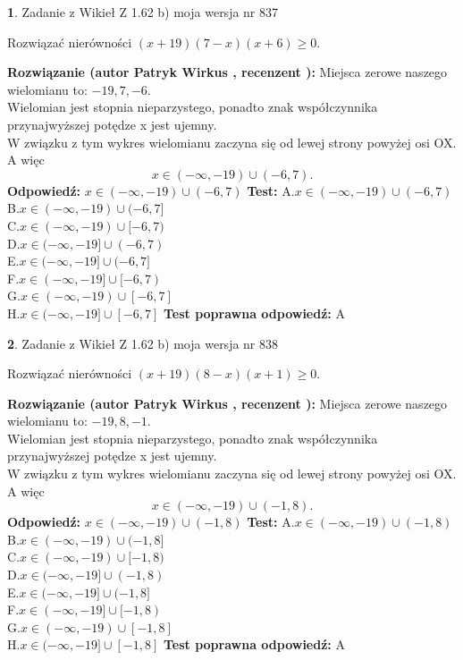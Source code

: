 \documentclass[12pt, a4paper]{article}
\theoremstyle{definition} %
\newtheorem{zad}{}
\newcommand{\zadStart}[1]{\begin{zad}#1\newline}
\newcommand{\zadStop}{\end{zad}}
\newcommand{\rozwStart}[2]{\noindent \textbf{Rozwiązanie (autor #1 , recenzent #2): }\newline}
\newcommand{\rozwStop}{\newline}
\newcommand{\odpStart}{\noindent \textbf{Odpowiedź:}\newline}
\newcommand{\odpStop}{\newline}
\newcommand{\testStart}{\noindent \textbf{Test:}\newline}
\newcommand{\testStop}{\newline}
\newcommand{\kluczStart}{\noindent \textbf{Test poprawna odpowiedź:}\newline}
\newcommand{\kluczStop}{\newline}
\begin{document}
\zadStart{Zadanie z Wikieł Z 1.62 b) moja wersja nr 837}

Rozwiązać nierówności $(x+19)(7-x)(x+6)\ge0$.
\zadStop
\rozwStart{Patryk Wirkus}{}
Miejsca zerowe naszego wielomianu to: $-19, 7, -6$.\\
Wielomian jest stopnia nieparzystego, ponadto znak współczynnika przy\linebreak najwyższej potędze x jest ujemny.\\ W związku z tym wykres wielomianu zaczyna się od lewej strony powyżej osi OX. A więc $$x \in (-\infty,-19) \cup (-6,7).$$
\rozwStop
\odpStart
$x \in (-\infty,-19) \cup (-6,7)$
\odpStop
\testStart
A.$x \in (-\infty,-19) \cup (-6,7)$\\
B.$x \in (-\infty,-19) \cup (-6,7]$\\
C.$x \in (-\infty,-19) \cup [-6,7)$\\
D.$x \in (-\infty,-19] \cup (-6,7)$\\
E.$x \in (-\infty,-19] \cup (-6,7]$\\
F.$x \in (-\infty,-19] \cup [-6,7)$\\
G.$x \in (-\infty,-19) \cup [-6,7]$\\
H.$x \in (-\infty,-19] \cup [-6,7]$
\testStop
\kluczStart
A
\kluczStop



\zadStart{Zadanie z Wikieł Z 1.62 b) moja wersja nr 838}

Rozwiązać nierówności $(x+19)(8-x)(x+1)\ge0$.
\zadStop
\rozwStart{Patryk Wirkus}{}
Miejsca zerowe naszego wielomianu to: $-19, 8, -1$.\\
Wielomian jest stopnia nieparzystego, ponadto znak współczynnika przy\linebreak najwyższej potędze x jest ujemny.\\ W związku z tym wykres wielomianu zaczyna się od lewej strony powyżej osi OX. A więc $$x \in (-\infty,-19) \cup (-1,8).$$
\rozwStop
\odpStart
$x \in (-\infty,-19) \cup (-1,8)$
\odpStop
\testStart
A.$x \in (-\infty,-19) \cup (-1,8)$\\
B.$x \in (-\infty,-19) \cup (-1,8]$\\
C.$x \in (-\infty,-19) \cup [-1,8)$\\
D.$x \in (-\infty,-19] \cup (-1,8)$\\
E.$x \in (-\infty,-19] \cup (-1,8]$\\
F.$x \in (-\infty,-19] \cup [-1,8)$\\
G.$x \in (-\infty,-19) \cup [-1,8]$\\
H.$x \in (-\infty,-19] \cup [-1,8]$
\testStop
\kluczStart
A
\kluczStop
\end{document}
